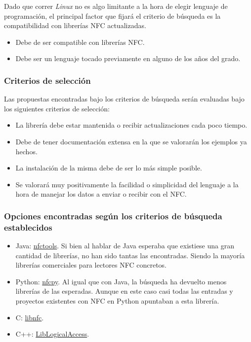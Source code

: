 Dado que correr \emph{Linux} no es algo limitante a la hora de elegir lenguaje de
programación, el principal factor que fijará el criterio de búsqueda es la
compatibilidad con librerías NFC actualizadas.

\begin{itemize}
    \item Debe de ser compatible con librerías NFC.
    \item Debe ser un lenguaje tocado previamente en alguno de los años del grado.
\end{itemize}

\subsubsection{Criterios de selección}

Las propuestas encontradas bajo los criterios de búsqueda serán evaluadas bajo
los siguientes criterios de selección:

\begin{itemize}
    \item La librería debe estar mantenida o recibir actualizaciones cada poco tiempo.
    \item Debe de tener documentación extensa en la que se valorarán los ejemplos ya hechos.
    \item La instalación de la misma debe de ser lo más simple posible.
    \item Se valorará muy positivamente la facilidad o simplicidad del lenguaje a la hora de manejar los datos a enviar o recibir con el NFC.
\end{itemize}

\subsubsection{Opciones encontradas según los criterios de búsqueda establecidos}

\begin{itemize}
    \item Java: \href{https://github.com/grundid/nfctools}{nfctools}. Si bien al
    hablar de Java esperaba que existiese una gran cantidad de librerías, no han
    sido tantas las encontradas. Siendo la mayoría librerías comerciales para
    lectores NFC concretos.
    \item Python: \href{https://github.com/nfcpy/nfcpy}{nfcpy}. Al igual que con
    Java, la búsqueda ha devuelto menos librerías de las esperadas. Aunque en
    este caso casi todas las entradas y proyectos existentes con NFC en Python
    apuntaban a esta librería.
    \item C: \href{https://github.com/nfc-tools/libnfc}{libnfc}. 
    \item C++: \href{https://github.com/liblogicalaccess/liblogicalaccess}{LibLogicalAccess}.
\end{itemize}

